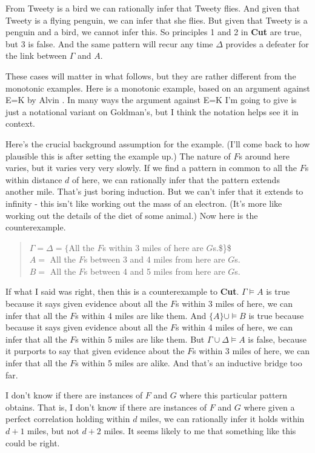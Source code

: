 \documentclass[11pt,]{book}
\begin{document}
From Tweety is a bird we can rationally infer that Tweety flies. And given that Tweety is a flying penguin, we can infer that she flies. But given that Tweety is a penguin and a bird, we cannot infer this. So principles 1 and 2 in \textbf{Cut} are true, but 3 is false. And the same pattern will recur any time \(\Delta\) provides a defeater for the link between \(\Gamma\) and \(A\).

These cases will matter in what follows, but they are rather different from the monotonic examples. Here is a monotonic example, based on an argument against E=K by Alvin \citet{Goldman2009}. In many ways the argument against E=K I'm going to give is just a notational variant on Goldman's, but I think the notation helps see it in context.

Here's the crucial background assumption for the example. (I'll come back to how plausible this is after setting the example up.) The nature of \(F\)s around here varies, but it varies very very slowly. If we find a pattern in common to all the \(F\)s within distance \(d\) of here, we can rationally infer that the pattern extends another mile. That's just boring induction. But we can't infer that it extends to infinity - this isn't like working out the mass of an electron. (It's more like working out the details of the diet of some animal.) Now here is the counterexample.

\begin{quote}
\(\Gamma = \Delta = \{\)All the \(F\)s within 3 miles of here are \(G\)s.\$\}\$\\
\(A =\) All the \(F\)s between 3 and 4 miles from here are \(G\)s.\\
\(B =\) All the \(F\)s between 4 and 5 miles from here are \(G\)s.
\end{quote}

If what I said was right, then this is a counterexample to \textbf{Cut}. \(\Gamma \vDash A\) is true because it says given evidence about all the \(F\)s within 3 miles of here, we can infer that all the \(F\)s within 4 miles are like them. And \(\{A\} \cup \vDash B\) is true because because it says given evidence about all the \(F\)s within 4 miles of here, we can infer that all the \(F\)s within 5 miles are like them. But \(\Gamma \cup \Delta \vDash A\) is false, because it purports to say that given evidence about the \(F\)s within 3 miles of here, we can infer that all the \(F\)s within 5 miles are alike. And that's an inductive bridge too far.

I don't know if there are instances of \(F\) and \(G\) where this particular pattern obtains. That is, I don't know if there are instances of \(F\) and \(G\) where given a perfect correlation holding within \(d\) miles, we can rationally infer it holds within \(d + 1\) miles, but not \(d + 2\) miles. It seems likely to me that something like this could be right.
\end{document}
